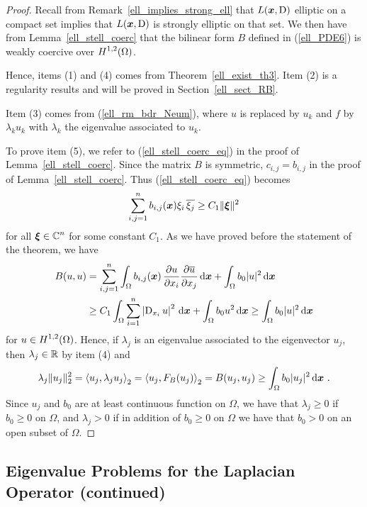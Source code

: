 \begin{proof}
Recall from Remark~\ref{ell_implies_strong_ell} that
$L({\bm{x}},\operatorname{D})$ elliptic on a compact set implies that
$L({\bm{x}},\operatorname{D})$ is strongly elliptic on that set.
We then have from Lemma~\ref{ell_stell_coerc} that the bilinear form $B$
defined in (\ref{ell_PDE6}) is weakly coercive over
$\displaystyle H^{1,2}(\Omega)$.

Hence, items (1) and (4) comes from
Theorem~\ref{ell_exist_th3}.  Item (2) is a
regularity results and will be proved in Section~\ref{ell_sect_RB}.

Item (3) comes from (\ref{ell_rm_bdr_Neum}),
where $u$ is replaced by $u_k$ and $f$ by $\lambda_k u_k$ with
$\lambda_k$ the eigenvalue associated to $u_k$.

To prove item (5), we refer to
(\ref{ell_stell_coerc_eq}) in the proof of
Lemma~\ref{ell_stell_coerc}.  Since the matrix $B$ is
symmetric, $c_{i,j} = b_{i,j}$ in the proof of
Lemma~\ref{ell_stell_coerc}.  Thus (\ref{ell_stell_coerc_eq}) becomes
\[
\sum_{i,j=1}^n b_{i,j}({\bm{x}}) \xi_i\,\overline{\xi_j} \geq C_1
\|{\bm{\xi}}\|^2 
\]
for all $\displaystyle {\bm{\xi}} \in \mathbb{C}^n$ for some constant $C_1$.
As we have proved before the statement of the theorem, we have
\begin{align*}
B(u,u) &= \sum_{i,j=1}^n \int_\Omega b_{i,j}({\bm{x}}) \,\frac{\partial{u}}{\partial x_i}
\frac{\partial{\overline{u}}}{\partial x_j}\,\mathrm{d}{{\bm{x}}} + \int_\Omega b_0 |u|^2 \,\mathrm{d}{{\bm{x}}} \\
&\geq C_1 \int_\Omega \sum_{i=1}^n \left| \operatorname{D}_{x_i} u \right|^2 \,\mathrm{d}{{\bm{x}}}
+ \int_\Omega b_0 u^2 \,\mathrm{d}{{\bm{x}}} \geq \int_\Omega b_0 |u|^2 \,\mathrm{d}{{\bm{x}}}
\end{align*}
for $\displaystyle u \in H^{1,2}(\Omega)$.
Hence, if $\lambda_j$ is an eigenvalue associated to the eigenvector
$u_j$, then $\lambda_j \in \mathbb{R}$ by item (4) and
\[
\lambda_j \|u_j\|_2^2 = \left\langle{u_j} , {\lambda_j u_j}\right\rangle_2
= \left\langle{u_j} , {F_B(u_j)}\right\rangle_2 = B(u_j,u_j)
\geq \int_\Omega b_0 |u_j|^2 \,\mathrm{d}{{\bm{x}}} \ .
\]
Since $u_j$ and $b_0$ are at least continuous function on $\Omega$, we
have that $\lambda_j \geq 0$ if $b_0\geq 0$ on $\Omega$, and $\lambda_j>0$
if in addition of $b_0\geq 0$ on $\Omega$ we have that $b_0> 0$ on an
open subset of $\Omega$.
\end{proof}

\subsection{Eigenvalue Problems for the Laplacian Operator
(continued)} \label{subsectEigLaplace}

